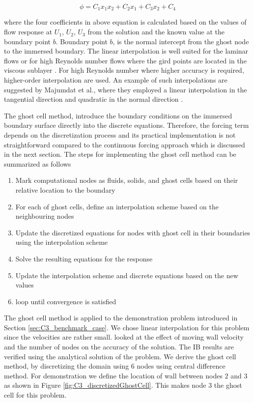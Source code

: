 \begin{equation}
	\phi = C_1 x_1 x_2 + C_2 x_1 + C_3 x_2 + C_4
\end{equation}

where the four coefficients in above equation is calculated based on the values of flow response at $U_1$, $U_2$, $U_3$ from the solution and the known value at the boundary point $b$. Boundary point $b$, is the normal intercept from the ghost node to the immersed boundary. The linear interpolation is well suited for the laminar flows or for high Reynolds number flows where the gird points are located in the viscous sublayer \cite{iaccarino2003immersed}. For high Reynolds number where higher accuracy is required, higher-order interpolation are used. An example of such interpolations are suggested by Majumdat et al., where they employed a linear interpolation in the tangential direction and quadratic in the normal direction \cite{majumdar2001rans}. 

The ghost cell method, introduce the boundary conditions on the immersed boundary surface directly into the discrete equations. Therefore, the forcing term depends on the discretization process and its practical implementation is not straightforward compared to the continuous forcing approach which is discussed in the next section. The steps for implementing the ghost cell method can be summarized as follows

\begin{enumerate}
	\item Mark computational nodes as fluids, solids, and ghost cells based on their relative location to the boundary
	\item For each of ghost cells, define an interpolation scheme based on the neighbouring nodes
	\item Update the discretized equations for nodes with ghost cell in their boundaries using the interpolation scheme
	\item Solve the resulting equations for the response
	\item Update the interpolation scheme and discrete equations based on the new values
	\item loop until convergence is satisfied
\end{enumerate}

The ghost cell method is applied to the demonstration problem introduced in Section \ref{sec:C3_benchmark_case}. We chose linear interpolation for this problem since the velocities are rather small. looked at the effect of moving wall velocity and the number of nodes on the accuracy of the solution. The IB results are verified using the analytical solution of the problem. We derive the ghost cell method, by discretizing the domain using 6 nodes using central difference method. For demonstration we define the location of wall between nodes $2$ and $3$ as shown in Figure \ref{fig:C3_discretizedGhostCell}. This makes node $3$ the ghost cell for this problem.

